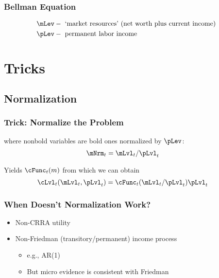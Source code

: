 \documentclass{beamer}
\begin{document}
\begin{frame}[label=vrecurse]
\frametitle{\large\textbf{Bellman Equation}}



\begin{equation*}\begin{gathered}\begin{aligned}
   \mLev  & - \text{ `market resources' (net worth plus current income)}
\\ \pLev  & - \text{ permanent labor income }
\end{aligned}\end{gathered}\end{equation*}

\end{frame}

\section{Tricks}
\subsection{Normalization}
\begin{frame}[label=Normalize]
\frametitle{\large\textbf{Trick: Normalize the Problem}}



where nonbold variables are bold ones normalized by $\pLev$:
\begin{equation}\begin{gathered}\begin{aligned}
\mNrm_{t}  & = \mLvl_{t}/\pLvl_{t}
\end{aligned}\end{gathered}\end{equation}

Yields $\cFunc_{t}(m)$ from which we can obtain
\begin{equation}\begin{gathered}\begin{aligned}
  \cLvl_{t}(\mLvl_{t},\pLvl_{t})  & = \cFunc_{t}(\mLvl_{t}/\pLvl_{t})\pLvl_{t}
\end{aligned}\end{gathered}\end{equation}

\end{frame}

\begin{frame}[label=Normalize]
\frametitle{\large\textbf{When Doesn't Normalization Work?}}

\begin{itemize}
\item Non-CRRA utility
\item Non-Friedman (transitory/permanent) income process
\begin{itemize}
\item e.g., AR(1)
\item But micro evidence is consistent with Friedman
\end{itemize}
\end{itemize}

\end{frame}
\end{document}
